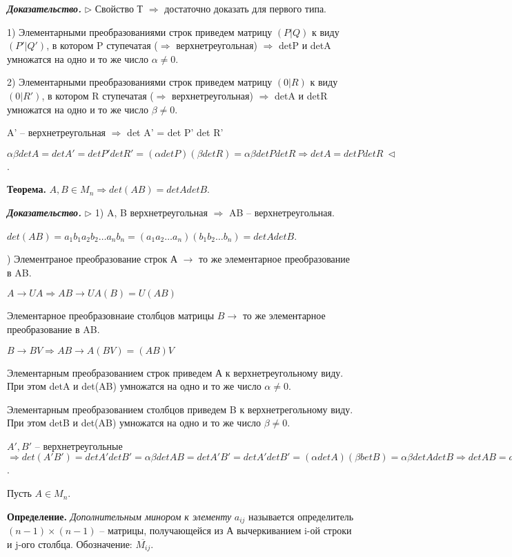 \bigskip
\textbf{\textit{Доказательство.}} $\rhd$ Свойство Т $\Rightarrow$ достаточно доказать для первого типа.

1) Элементарными преобразованиями строк приведем матрицу $(P|Q)$ к виду $(P'|Q')$, в котором P ступечатая ($\Rightarrow$ верхнетреугольная) $\Rightarrow$ detP и detA умножатся на одно и то же число $\alpha \neq 0$. 

2) Элементарными преобразованиями строк приведем матрицу $(0|R)$ к виду $(0|R')$, в котором R ступечатая ($\Rightarrow$ верхнетреугольная) $\Rightarrow$ detA и detR умножатся на одно и то же число $\beta \neq 0$. 

A' -- верхнетреугольная $\Rightarrow$ det A' = det P' det R'

$\alpha \beta det A = det A' = det P' det R' = (\alpha det P) (\beta det R) = \alpha \beta det P det R \Rightarrow det A = det P det R \ \lhd$.

\bigskip
\textbf{Теорема.} $A, B \in M_n \Rightarrow det(AB) = detA detB$.

\bigskip
\textbf{\textit{Доказательство.}} $\rhd$ 1) A, B верхнетреугольная $\Rightarrow$ AB -- верхнетреугольная.


$det(AB) = a_1 b_1 a_2 b_2 \dots a_n b_n = (a_1 a_2 \dots a_n)(b_1 b_2 \dots b_n) = det A det B$.

) Элементраное преобразование строк А $\rightarrow$ то же элементарное преобразование в AB.

$A \rightarrow UA \Rightarrow AB \rightarrow UA(B) = U(AB)$

Элементарное преобразовнаие столбцов матрицы $B \rightarrow$ то же элементарное преобразование в AB.

$B \rightarrow BV \Rightarrow AB \rightarrow A(BV) = (AB)V$

\bigskip
Элементарным преобразованием строк приведем А к верхнетреугольному виду. При этом detA и det(AB) умножатся на одно и то же число $\alpha \neq 0$.

Элементарным преобразованием столбцов приведем B к верхнетрегольному виду. При этом detB и det(AB) умножатся на одно и то же число $\beta \neq 0$.


\bigskip
$A', B'$ -- верхнетреугольные $\Rightarrow det(A'B') = detA' detB' = \alpha \beta detAB = detA'B' = detA' det B' = (\alpha det A)(\beta bet B) = \alpha \beta det A det B \Rightarrow detAB = detA detB \ \lhd$.

\bigskip
Пусть $A \in M_n$.

\textbf{Определение.} \textit{Дополнительным минором к элементу} $a_{ij}$ называется определитель $(n-1) \times (n-1)$ -- матрицы, получающейся из А вычеркиванием i-ой строки и j-ого столбца. Обозначение: $\overline{M_{ij}}$.

